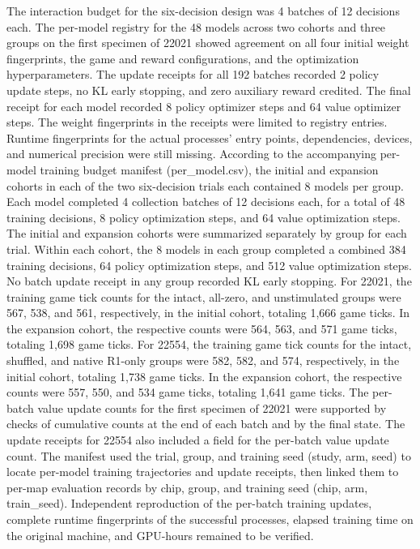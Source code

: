 \documentclass{article}
\begin{document}
The interaction budget for the six-decision design was 4 batches of 12 decisions each. The per-model registry for the 48 models across two cohorts and three groups on the first specimen of 22021 showed agreement on all four initial weight fingerprints, the game and reward configurations, and the optimization hyperparameters. The update receipts for all 192 batches recorded 2 policy update steps, no KL early stopping, and zero auxiliary reward credited. The final receipt for each model recorded 8 policy optimizer steps and 64 value optimizer steps. The weight fingerprints in the receipts were limited to registry entries. Runtime fingerprints for the actual processes' entry points, dependencies, devices, and numerical precision were still missing. According to the accompanying per-model training budget manifest (per\_\allowbreak{}model.csv), the initial and expansion cohorts in each of the two six-decision trials each contained 8 models per group. Each model completed 4 collection batches of 12 decisions each, for a total of 48 training decisions, 8 policy optimization steps, and 64 value optimization steps. The initial and expansion cohorts were summarized separately by group for each trial. Within each cohort, the 8 models in each group completed a combined 384 training decisions, 64 policy optimization steps, and 512 value optimization steps. No batch update receipt in any group recorded KL early stopping. For 22021, the training game tick counts for the intact, all-zero, and unstimulated groups were 567, 538, and 561, respectively, in the initial cohort, totaling 1,666 game ticks. In the expansion cohort, the respective counts were 564, 563, and 571 game ticks, totaling 1,698 game ticks. For 22554, the training game tick counts for the intact, shuffled, and native R1-only groups were 582, 582, and 574, respectively, in the initial cohort, totaling 1,738 game ticks. In the expansion cohort, the respective counts were 557, 550, and 534 game ticks, totaling 1,641 game ticks. The per-batch value update counts for the first specimen of 22021 were supported by checks of cumulative counts at the end of each batch and by the final state. The update receipts for 22554 also included a field for the per-batch value update count. The manifest used the trial, group, and training seed (study, arm, seed) to locate per-model training trajectories and update receipts, then linked them to per-map evaluation records by chip, group, and training seed (chip, arm, train\_\allowbreak{}seed). Independent reproduction of the per-batch training updates, complete runtime fingerprints of the successful processes, elapsed training time on the original machine, and GPU-hours remained to be verified.
\end{document}
